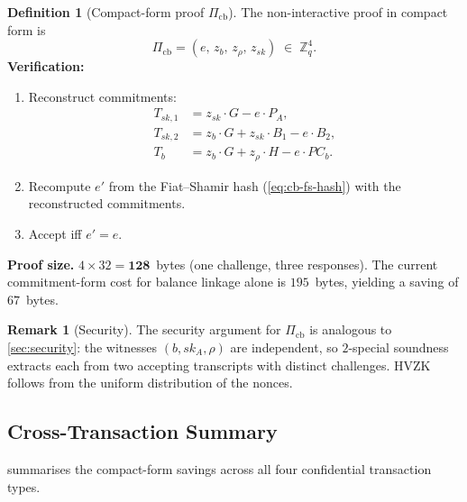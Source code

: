 \documentclass[11pt]{article}
\theoremstyle{definition}
\newtheorem{definition}[theorem]{Definition}
\newtheorem{remark}[theorem]{Remark}
\newcommand{\Zq}{\mathbb{Z}_q}
\newcommand{\sk}{\mathit{sk}}
\begin{document}
\begin{definition}[Compact-form proof $\Pi_{\mathrm{cb}}$]
  \label{def:compact-cb}
  The non-interactive proof in compact form is
  \[
    \Pi_{\mathrm{cb}} = (e,\, z_b,\, z_\rho,\, z_{\sk})
    \;\in\; \Zq^4.
  \]
  \textbf{Verification:}
  \begin{enumerate}
    \item Reconstruct commitments:
    \begin{align}
      T_{\sk,1} &= z_{\sk} \cdot G - e \cdot P_A,
        \label{eq:recon-cb-tsk1} \\
      T_{\sk,2} &= z_b \cdot G + z_{\sk} \cdot B_1 - e \cdot B_2,
        \label{eq:recon-cb-tsk2} \\
      T_b &= z_b \cdot G + z_\rho \cdot H - e \cdot \mathit{PC}_b.
        \label{eq:recon-cb-tb}
    \end{align}
    \item Recompute $e'$ from the Fiat--Shamir hash
          (\cref{eq:cb-fs-hash}) with the reconstructed commitments.
    \item Accept iff $e' = e$.
  \end{enumerate}
\end{definition}

\noindent\textbf{Proof size.}
$4 \times 32 = \mathbf{128}$~bytes (one challenge, three responses).
The current commitment-form cost for balance linkage alone is
$195$~bytes, yielding a saving of $67$~bytes.

\begin{remark}[Security]
  The security argument for $\Pi_{\mathrm{cb}}$ is analogous to
  \cref{sec:security}: the witnesses $(b, \sk_A, \rho)$ are
  independent, so $2$-special soundness extracts each from two
  accepting transcripts with distinct challenges.
  HVZK follows from the uniform distribution of the nonces.
\end{remark}

\subsection{Cross-Transaction Summary}
\label{sec:cross-tx-summary}

 summarises the compact-form savings across all
four confidential transaction types.
\end{document}
